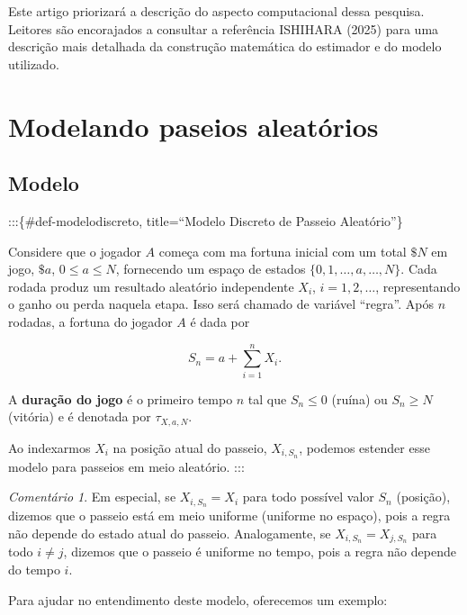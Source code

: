\documentclass[
  brazilian,
  12pt,
]{article}
\theoremstyle{definition}
\theoremstyle{remark}
\newtheorem{refremark}{Comentário}[section]
\begin{document}
Este artigo priorizará a descrição do aspecto computacional dessa
pesquisa. Leitores são encorajados a consultar a referência ISHIHARA
(2025) para uma descrição mais detalhada da construção matemática do
estimador e do modelo utilizado.

\section{Modelando paseios
aleatórios}\label{modelando-paseios-aleatuxf3rios}

\subsection{Modelo}\label{modelo}

:::\{\#def-modelodiscreto, title=``Modelo Discreto de Passeio
Aleatório''\}

Considere que o jogador \(A\) começa com ma fortuna inicial com um total
\(\$N\) em jogo, \(\$a\), \(0 \leq a \leq N\), fornecendo um espaço de
estados \(\{0, 1,
\dots, a, \dots, N\}\). Cada rodada produz um resultado aleatório
independente \(X_i\), \(i=1,2,\dots\), representando o ganho ou perda
naquela etapa. Isso será chamado de variável ``regra''. Após \(n\)
rodadas, a fortuna do jogador \(A\) é dada por

\[
    S_n = a + \sum_{i=1}^n X_i.
\]

A \textbf{duração do jogo} é o primeiro tempo \(n\) tal que
\(S_n \leq 0\) (ruína) ou \(S_n \geq N\) (vitória) e é denotada por
\(\tau_{X, a, N}\).

Ao indexarmos \(X_i\) na posição atual do passeio, \(X_{i, S_n}\),
podemos estender esse modelo para passeios em meio aleatório. :::

\begin{refremark}
Em especial, se \(X_{i, S_n} = X_i\) para todo possível valor \(S_n\)
(posição), dizemos que o passeio está em meio uniforme (uniforme no
espaço), pois a regra não depende do estado atual do passeio.
Analogamente, se \(X_{i, S_n} = X_{j, S_n}\) para todo \(i \neq j\),
dizemos que o passeio é uniforme no tempo, pois a regra não depende do
tempo \(i\).

\label{rem-uniforme}

\end{refremark}

Para ajudar no entendimento deste modelo, oferecemos um exemplo:
\end{document}
